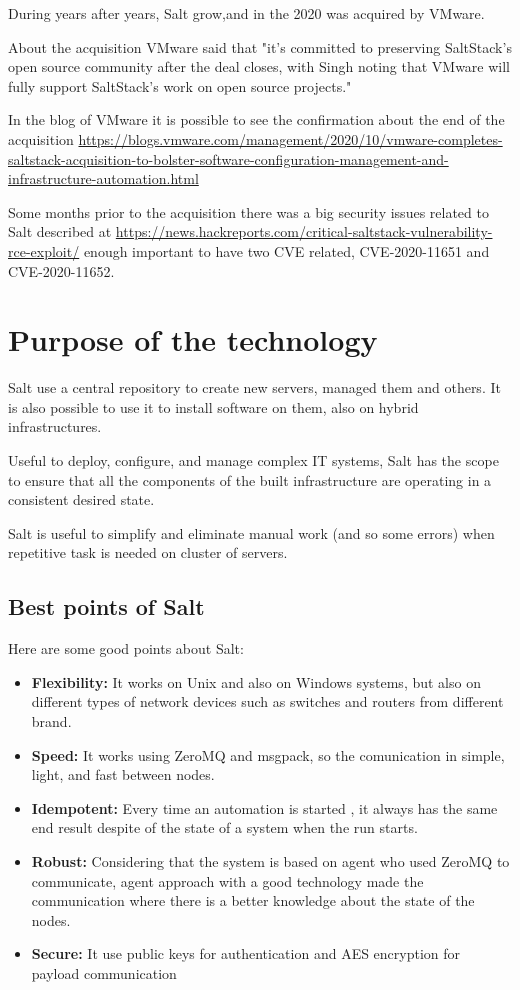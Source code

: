 \documentclass[12pt,a4paper,openright,twoside]{book}
\begin{document}
During years after years, Salt grow,and in the 2020 was acquired by VMware.


About the acquisition VMware said that "it's committed to preserving SaltStack's open source community after the deal closes, with Singh noting that VMware will fully support SaltStack's work on open source projects."\cite{saltAcq}


In the blog of VMware it is possible to see the confirmation about the end of the acquisition
\url{https://blogs.vmware.com/management/2020/10/vmware-completes-saltstack-acquisition-to-bolster-software-configuration-management-and-infrastructure-automation.html}

Some months prior to the acquisition there was a big security issues related to Salt described at \url{https://news.hackreports.com/critical-saltstack-vulnerability-rce-exploit/} enough important to have two CVE related, CVE-2020-11651 and CVE-2020-11652.

\section{Purpose of the technology}
Salt use a central repository to create new servers, managed them and others. It is also possible to use it to install software on them, also on hybrid infrastructures.


Useful to deploy, configure, and manage complex IT systems, Salt has the scope to ensure that all the components of the built infrastructure are operating in a consistent desired state.


Salt is useful to simplify and eliminate manual work (and so some errors) when repetitive task is needed on cluster of servers.

\subsection{Best points of Salt}

Here are some good points about Salt:
\begin{itemize}
    \item \textbf{Flexibility:} It works on Unix and also on Windows systems, but also on different types of network devices such as switches and routers from different brand.
    \item \textbf{Speed:} It works using ZeroMQ and msgpack, so the comunication in simple, light, and fast between nodes.
    \item \textbf{Idempotent:} Every time an automation is started , it always has the same end result despite of the state of a system when the run starts.
    \item \textbf{Robust:} Considering that the system is based on agent who used ZeroMQ to communicate, agent approach with a good technology made the communication where there is a better knowledge about the state of the nodes.
    \item \textbf{Secure:} It use public keys for authentication and AES encryption for payload communication
\end{itemize}
\end{document}
